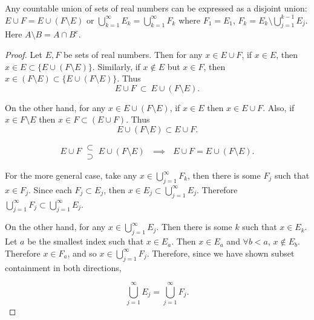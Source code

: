 \pagebreak
\begin{pblm}%
	Any countable union of sets of real numbers can be expressed as a disjoint 
	union: $E \cup F = E \cup (F \setminus E)$ or $\bigcup\limits_{k = 1}^\infty 
	E_k = \bigcup\limits_{k = 1}^\infty F_k$ where $F_1 = E_1$, 
	$F_k = E_k \setminus \bigcup \limits_{j = 1}^{k - 1} E_j$. Here $A \setminus B = 
	A \cap B^c$. 
\begin{proof}
	Let $E, F$ be sets of real numbers. 
	Then for any $x \in E \cup F$, if $x \in E$, then 
	$x \in E \subset \{E \cup (F \setminus E)\}$. Similarly, if $x \notin E$ but 
	$x \in F$, then $x \in (F \setminus E) \subset \{E \cup (F \setminus E)\}$. 
	Thus 
	\begin{equation*}
		E \cup F ~\subset~ E \cup (F\setminus E). 
	\end{equation*}

	On the other hand, for any $x \in E \cup (F \setminus E)$, if $x \in E$ then 
	$x \in E \cup F$. Also, if $x \in F \setminus E$ then $x \in F \subset (E \cup F)$. 
	Thus 
	\begin{equation*}
		E \cup (F \setminus E) \subset E \cup F. 
	\end{equation*}

	\begin{equation*}
		E \cup F ~ \substack{\subset \\ \supset}~ E \cup (F \setminus E) ~~~\implies~~~
		E \cup F = E \cup (F \setminus E).
	\end{equation*}

	For the more general case, take any $x \in \bigcup\limits_{j=1}^\infty F_k$, then there is some $F_j$ such that 
	$x \in F_j$. Since each $F_j \subset E_j$, then 
	$x \in E_j \subset \bigcup\limits_{j=1}^\infty E_j$. Therefore 
	$\bigcup\limits_{j=1}^\infty F_j\subset \bigcup\limits_{j=1}^\infty E_j$. 

	On the other hand, for any $x \in \bigcup\limits_{j=1}^\infty E_j$. Then there is 
	some $k$ such that $x \in E_k$. Let $a$ be the 
	smallest index such that $x \in E_a$. Then $x \in E_a$ and $\forall b < a$, $x 
	\notin E_b$. Therefore $x \in F_a$, and so $x \in \bigcup\limits_{j=1}^\infty F_j$. 
	Therefore, since we have shown subset containment in both directions, 

	\begin{equation*}
		\bigcup\limits_{j=1}^\infty E_j = \bigcup\limits_{j=1}^\infty F_j. 
	\end{equation*}
\end{proof}
\end{pblm}

